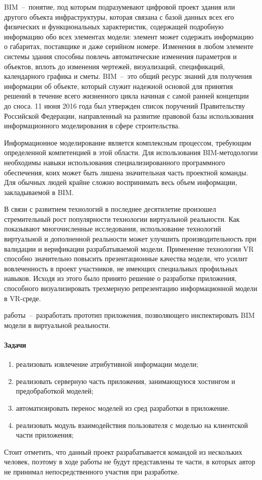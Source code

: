 ﻿
BIM~--~понятие, под которым подразумевают цифровой проект здания или другого объекта инфраструктуры,
которая связана с базой данных всех его физических и функциональных характеристик,
содержащей подробную информацию обо всех элементах модели:
элемент может содержать информацию о габаритах, поставщике и даже серийном номере. 
Изменения в любом элементе системы здания способны повлечь автоматические изменения  параметров и объектов, 
вплоть до изменения чертежей, визуализаций, спецификаций, календарного графика и сметы.
BIM~--~это общий ресурс знаний для получения информации об объекте,
который служит надежной основой для принятия решений в течение всего жизненного цикла
начиная с самой ранней концепции до сноса.
\cite{NationalBIMfaqs}
11 июня 2016 года был утвержден список поручений Правительству Российской Федерации,
направленный на развитие правовой базы использования информационного моделирования в сфере строительства.
\cite{KremlinInstraction2016}

Информационное моделирование является комплексным процессом,
требующим определенной компетенцией в этой области.
Для использования BIM-методологии необходимы навыки использования специализированного программного обеспечения,
коих может быть лишена значительная часть проектной команды.
Для обычных людей крайне сложно воспринимать весь объем информации, закладываемой в BIM.

В связи с развитием технологий в последнее десятилетие
произошел стремительный рост популярности технологии виртуальной реальности.
\cite{Cipresso2018}
Как показывают многочисленные исследования,
использование технологий виртуальной и дополненной реальности может улучшить
производительность при валидации и верификации разрабатываемой модели.
Применение технологии VR способно значительно повысить презентационные качества модели,
что усилит вовлеченность в проект участников,
не имеющих специальных профильных навыков.
\cite{Akpan2018}
Исходя из этого было принято решение о разработке приложения,
способного визуализировать трехмерную репрезентацию информационной модели в VR-среде. 

{ работы}~--~разработать прототип приложения, позволяющего инспектировать BIM модели в виртуальной реальности.

\paragraph{Задачи}
\begin{enumerate}
    \item реализовать извлечение атрибутивной информации модели;
    \item реализовать серверную часть приложения, занимающуюся хостингом и предобработкой моделей;
    \item автоматизировать перенос моделей из сред разработки в приложение.
    \item реализовать модуль взаимодействия пользователя с моделью на клиентской части приложения;
\end{enumerate}

Стоит отметить, что данный проект разрабатывается командой из нескольких человек,
поэтому в ходе работы не будут представлены те части,
в которых автор не принимал непосредственного участия при разработке.